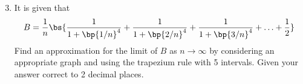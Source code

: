 \begin{problem}
\begin{center}
    \end{center}

    \begin{enumerate}
        \setcounter{enumi}{2}
        \item It is given that \[B = \frac1n \bs{\frac1{1 + \bp{1/n}^4} + \frac1{1 + \bp{2/n}^4} + \frac1{1 + \bp{3/n}^4} + \ldots + \frac12}\] Find an approximation for the limit of $B$ as $n \to \infty$ by considering an appropriate graph and using the trapezium rule with 5 intervals. Given your answer correct to 2 decimal places.
    \end{enumerate}
\end{problem}
